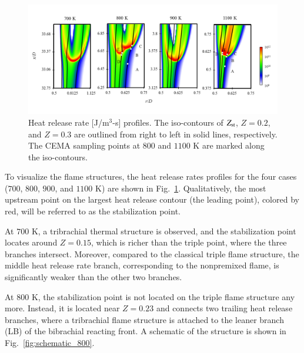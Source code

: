 \documentclass[review,3p,times]{elsarticle}
\begin{document}
\begin{figure}[t]
  \centering
  \scriptsize
  \vspace{-0.1in}
  \includegraphics[width=1.0\textwidth]{HRR.png}
  \normalsize
  \vspace{-0.1in}
  \caption{Heat release rate [J/m$^3$-s] profiles.  The iso-contours of $Z_{\rm st}$, $Z = 0.2$, and $Z = 0.3$ are outlined from right to left in solid lines, respectively.  The CEMA sampling points at $800$ and $1100$ K are marked along the iso-contours.}
  \label{fig:HRR}
\end{figure}

To visualize the flame structures, the heat release rates profiles for the four cases ($700$, $800$, $900$, and $1100$ K) are shown in Fig.~\ref{fig:HRR}.  Qualitatively, the most upstream point on the largest heat release contour (the leading point), colored by red, will be referred to as the stabilization point.  

At $700$ K, a tribrachial thermal structure is observed, and the stabilization point locates around $Z = 0.15$, which is richer than the triple point, where the three branches intersect.  Moreover, compared to the classical triple flame structure, the middle heat release rate branch, corresponding to the nonpremixed flame, is significantly weaker than the other two branches.  

At $800$ K, the stabilization point is not located on the triple flame structure any more.  Instead, it is located near $Z = 0.23$ and connects two trailing heat release branches, where a tribrachial flame structure is attached to the leaner branch (LB) of the bibrachial reacting front.  A schematic of the structure is shown in Fig.~\ref{fig:schematic_800}.
\end{document}
